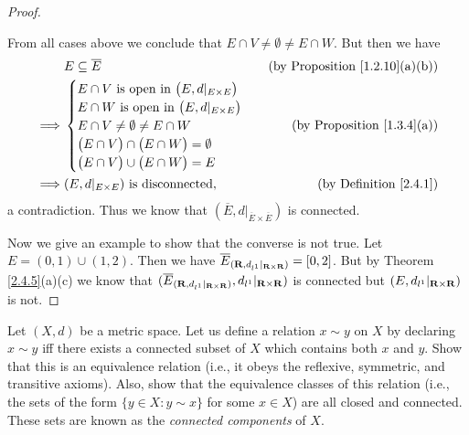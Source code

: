 \begin{proof}
\begin{itemize}
    \end{itemize}
    From all cases above we conclude that \(E \cap V \neq \emptyset \neq E \cap W\).
    But then we have
    \begin{align*}
                 & E \subseteq \overline{E}                                     & \text{(by Proposition \ref{1.2.10}(a)(b))} \\
        \implies & \begin{cases}
                       E \cap V \text{ is open in } \big(E, d|_{E \times E}\big) \\
                       E \cap W \text{ is open in } \big(E, d|_{E \times E}\big) \\
                       E \cap V \neq \emptyset \neq E \cap W                     \\
                       \big(E \cap V\big) \cap \big(E \cap W\big) = \emptyset    \\
                       \big(E \cap V\big) \cup \big(E \cap W\big) = E
                   \end{cases} & \text{(by Proposition \ref{1.3.4}(a))}                                                 \\
        \implies & (E, d|_{E \times E}) \text{ is disconnected},                & \text{(by Definition \ref{2.4.1})}
    \end{align*}
    a contradiction.
    Thus we know that \((\overline{E}, d|_{\overline{E} \times \overline{E}})\) is connected.

    Now we give an example to show that the converse is not true.
    Let \(E = (0, 1) \cup (1, 2)\).
    Then we have \(\overline{E}_{(\mathbf{R}, d_{l^1}|_{\mathbf{R} \times \mathbf{R}})} = [0, 2]\).
    But by Theorem \ref{2.4.5}(a)(c) we know that \((\overline{E}_{(\mathbf{R}, d_{l^1}|_{\mathbf{R} \times \mathbf{R}})}, d_{l^1}|_{\mathbf{R} \times \mathbf{R}})\) is connected but \((E, d_{l^1}|_{\mathbf{R} \times \mathbf{R}})\) is not.
\end{proof}

\begin{exercise}\label{ex 2.4.9}
    Let \((X, d)\) be a metric space. Let us define a relation \(x \sim y\) on \(X\) by declaring \(x \sim y\) iff there exists a connected subset of \(X\) which contains both \(x\) and \(y\).
    Show that this is an equivalence relation (i.e., it obeys the reflexive, symmetric, and transitive axioms).
    Also, show that the equivalence classes of this relation (i.e., the sets of the form \(\{y \in  X : y \sim x\}\) for some \(x \in X\)) are all closed and connected.
    These sets are known as the \emph{connected components} of \(X\).
\end{exercise}

